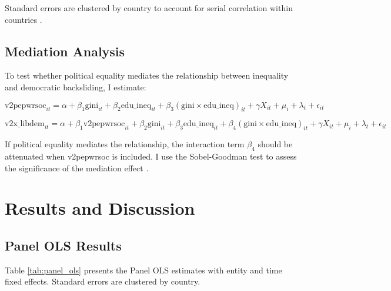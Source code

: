 \documentclass[11pt,letterpaper]{article}
\begin{document}
Standard errors are clustered by country to account for serial correlation within countries \cite{Cameron2015}.

\subsection{Mediation Analysis}

To test whether political equality mediates the relationship between inequality and democratic backsliding, I estimate:

\begin{equation}
\text{v2pepwrsoc}_{it} = \alpha + \beta_1 \text{gini}_{it} + \beta_2 \text{edu\_ineq}_{it} + \beta_3 (\text{gini} \times \text{edu\_ineq})_{it} + \gamma X_{it} + \mu_i + \lambda_t + \epsilon_{it}
\end{equation}

\begin{equation}
\text{v2x\_libdem}_{it} = \alpha + \beta_1 \text{v2pepwrsoc}_{it} + \beta_2 \text{gini}_{it} + \beta_3 \text{edu\_ineq}_{it} + \beta_4 (\text{gini} \times \text{edu\_ineq})_{it} + \gamma X_{it} + \mu_i + \lambda_t + \epsilon_{it}
\end{equation}

If political equality mediates the relationship, the interaction term $\beta_4$ should be attenuated when v2pepwrsoc is included. I use the Sobel-Goodman test to assess the significance of the mediation effect \cite{Sobel1982}.

\section{Results and Discussion}

\subsection{Panel OLS Results}

Table \ref{tab:panel_ols} presents the Panel OLS estimates with entity and time fixed effects. Standard errors are clustered by country.
\end{document}

